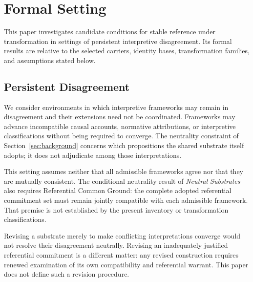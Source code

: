 
\section{Formal Setting}
\label{sec:formal_setting}

This paper investigates candidate conditions for stable reference under
transformation in settings of persistent interpretive disagreement.
Its formal results are relative to the selected carriers, identity bases,
transformation families, and assumptions stated below.


\subsection{Persistent Disagreement}
\label{subsec:persistent_disagreement}

We consider environments in which interpretive frameworks may remain
in disagreement and their extensions need not be coordinated.
Frameworks may advance incompatible causal accounts, normative attributions,
or interpretive classifications without being required to converge.
The neutrality constraint of Section~\ref{sec:background} concerns which
propositions the shared substrate itself adopts; it does not adjudicate
among those interpretations.

This setting assumes neither that all admissible frameworks agree nor that
they are mutually consistent.
The conditional neutrality result of
\emph{Neutral Substrates} also requires Referential Common Ground: the
complete adopted referential commitment set must remain jointly compatible
with each admissible framework.
That premise is not established by the
present inventory or transformation classifications.

Revising a substrate merely to make conflicting interpretations converge
would not resolve their disagreement neutrally.
Revising an inadequately
justified referential commitment is a different matter: any revised
construction requires renewed examination of its own compatibility and
referential warrant.
This paper does not define such a revision procedure.

